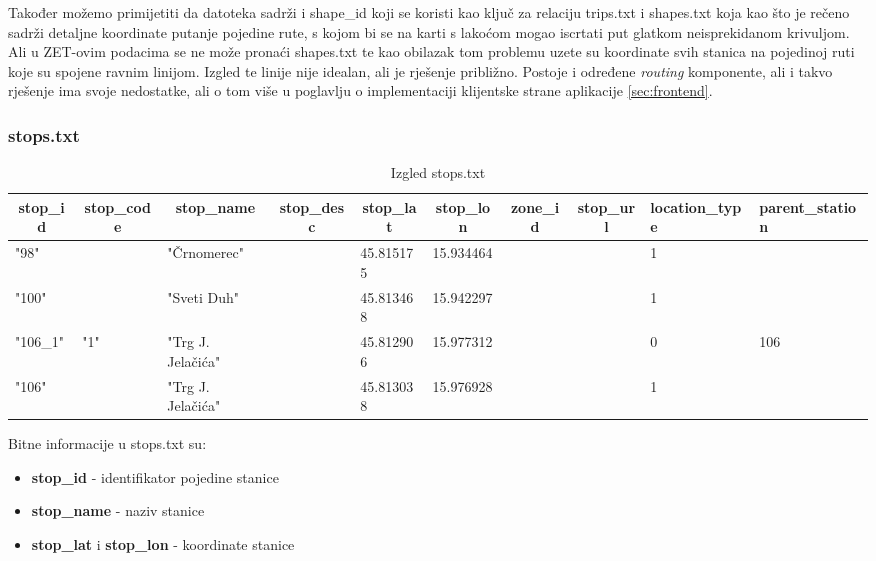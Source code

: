 \documentclass[zavrsnirad]{fer}
\begin{document}
Također možemo primijetiti da datoteka sadrži i shape\_id koji se koristi kao ključ za relaciju trips.txt i shapes.txt koja kao što je rečeno sadrži detaljne koordinate putanje pojedine rute, s kojom bi se na karti s lakoćom mogao iscrtati put glatkom neisprekidanom krivuljom.
Ali u ZET-ovim podacima se ne može pronaći shapes.txt te kao obilazak tom problemu uzete su koordinate svih stanica na pojedinoj ruti koje su spojene ravnim linijom. Izgled te linije nije idealan, ali je rješenje približno. Postoje i određene \textit{routing} komponente, ali i takvo rješenje ima svoje nedostatke, ali o tom više u poglavlju o implementaciji klijentske strane aplikacije \ref{sec:frontend}.

\subsubsection{stops.txt}

\begin{table}[htb]
	\begin{adjustbox}{width=\columnwidth,center}
	\begin{tabular}{l|l|l|l|l|l|l|l|l|l}
		\hline
		\multicolumn{1}{c|}{\textbf{stop\_id}} & \multicolumn{1}{c|}{\textbf{stop\_code}} & \multicolumn{1}{c|}{\textbf{stop\_name}} & \multicolumn{1}{c|}{\textbf{stop\_desc}} & \multicolumn{1}{c|}{\textbf{stop\_lat}} & \multicolumn{1}{c|}{\textbf{stop\_lon}} & \multicolumn{1}{c|}{\textbf{zone\_id}} & \multicolumn{1}{c|}{\textbf{stop\_url}} & \textbf{location\_type} & \textbf{parent\_station} \\ \hline
		"98" &  & "Črnomerec" &  & 45.815175 & 15.934464 &  &  & 1 &  \\ \hline
		"100" &  & "Sveti Duh" &  & 45.813468 & 15.942297 &  &  & 1 &  \\ \hline
		"106\_1" & "1" & "Trg J. Jelačića" &  & 45.812906 & 15.977312 &  &  & 0 & 106 \\ \hline
		"106" &  & "Trg J. Jelačića" &  & 45.813038 & 15.976928 &  &  & 1 &  \\ \hline
	\end{tabular}
	\end{adjustbox}
	\caption{Izgled stops.txt}
	\label{tbl:stops}
\end{table}

Bitne informacije u stops.txt su:
\begin{itemize}
	\item \textbf{stop\_id} - identifikator pojedine stanice
	\item \textbf{stop\_name} - naziv stanice
	\item \textbf{stop\_lat} i \textbf{stop\_lon} - koordinate stanice
\end{itemize}
\end{document}

